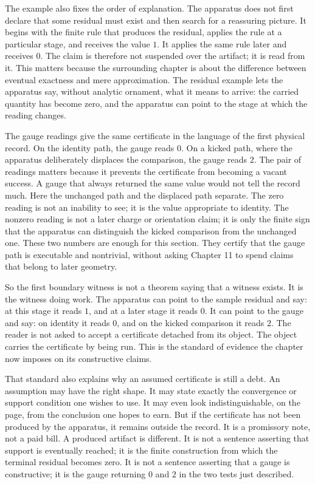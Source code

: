 The example also fixes the order of explanation. The apparatus does not first
declare that some residual must exist and then search for a reassuring picture.
It begins with the finite rule that produces the residual, applies the rule at a
particular stage, and receives the value \(1\). It applies the same rule later
and receives \(0\). The claim is therefore not suspended over the artifact; it
is read from it. This matters because the surrounding chapter is about the
difference between eventual exactness and mere approximation. The residual
example lets the apparatus say, without analytic ornament, what it means to
arrive: the carried quantity has become zero, and the apparatus can point to the
stage at which the reading changes.

The gauge readings give the same certificate in the language of the first
physical record. On the identity path, the gauge reads \(0\). On a kicked path,
where the apparatus deliberately displaces the comparison, the gauge reads \(2\).
The pair of readings matters because it prevents the certificate from becoming a
vacant success. A gauge that always returned the same value would not tell the
record much. Here the unchanged path and the displaced path separate. The zero
reading is not an inability to see; it is the value appropriate to identity. The
nonzero reading is not a later charge or orientation claim; it is only the
finite sign that the apparatus can distinguish the kicked comparison from the
unchanged one. These two numbers are enough for this section. They certify that
the gauge path is executable and nontrivial, without asking Chapter 11 to spend
claims that belong to later geometry.

So the first boundary witness is not a theorem saying that a witness exists. It
is the witness doing work. The apparatus can point to the sample residual and
say: at this stage it reads \(1\), and at a later stage it reads \(0\). It can
point to the gauge and say: on identity it reads \(0\), and on the kicked
comparison it reads \(2\). The reader is not asked to accept a certificate
detached from its object. The object carries the certificate by being run. This
is the standard of evidence the chapter now imposes on its constructive claims.

That standard also explains why an assumed certificate is still a debt. An
assumption may have the right shape. It may state exactly the convergence or
support condition one wishes to use. It may even look indistinguishable, on the
page, from the conclusion one hopes to earn. But if the certificate has not been
produced by the apparatus, it remains outside the record. It is a promissory
note, not a paid bill. A produced artifact is different. It is not a sentence
asserting that support is eventually reached; it is the finite construction from
which the terminal residual becomes zero. It is not a sentence asserting that a
gauge is constructive; it is the gauge returning \(0\) and \(2\) in the two
tests just described.

